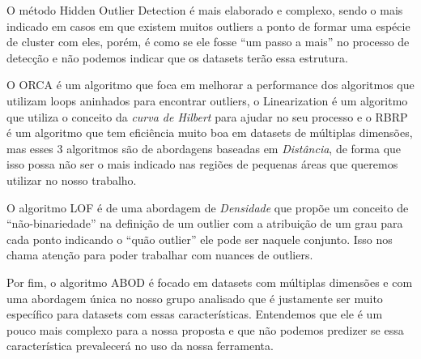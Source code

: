 O método Hidden Outlier Detection é mais elaborado e complexo, sendo o mais indicado em casos em que existem muitos outliers a ponto de formar uma espécie de cluster com eles, porém, é como se ele fosse ``um passo a mais'' no processo de detecção e não podemos indicar que os datasets terão essa estrutura.

O ORCA é um algoritmo que foca em melhorar a performance dos algoritmos que utilizam loops aninhados para encontrar outliers, o Linearization é um algoritmo que utiliza o conceito da \textit{curva de Hilbert} para ajudar no seu processo e o RBRP é um algoritmo que tem eficiência muito boa em datasets de múltiplas dimensões, mas esses 3 algoritmos são de abordagens baseadas em \textit{Distância}, de forma que isso possa não ser o mais indicado nas regiões de pequenas áreas que queremos utilizar no nosso trabalho.

O algoritmo LOF é de uma abordagem de \textit{Densidade} que propõe um conceito de ``não-binariedade'' na definição de um outlier com a atribuição de um grau para cada ponto indicando o ``quão outlier'' ele pode ser naquele conjunto. Isso nos chama atenção para poder trabalhar com nuances de outliers.

Por fim, o algoritmo ABOD é focado em datasets com múltiplas dimensões e com uma abordagem única no nosso grupo analisado que é justamente ser muito específico para datasets com essas características. Entendemos que ele é um pouco mais complexo para a nossa proposta e que não podemos predizer se essa característica prevalecerá no uso da nossa ferramenta.